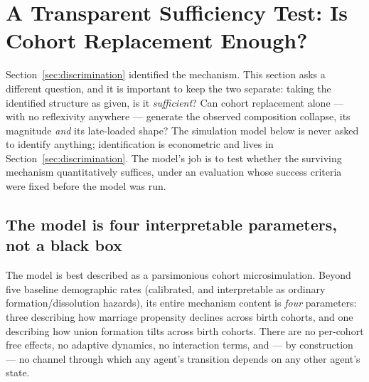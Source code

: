 \section{A Transparent Sufficiency Test: Is Cohort Replacement Enough?}
\label{sec:model}

Section~\ref{sec:discrimination} identified the mechanism. This section asks a
different question, and it is important to keep the two separate: taking the
identified structure as given, is it \emph{sufficient}? Can cohort replacement
alone --- with no reflexivity anywhere --- generate the observed composition
collapse, its magnitude \emph{and} its late-loaded shape? The simulation model
below is never asked to identify anything; identification is econometric and
lives in Section~\ref{sec:discrimination}. The model's job is to test whether
the surviving mechanism quantitatively suffices, under an evaluation whose
success criteria were fixed before the model was run.

\subsection{The model is four interpretable parameters, not a black box}
\label{sec:modelspec}

The model is best described as a parsimonious cohort microsimulation. Beyond
five baseline demographic rates (calibrated, and interpretable as ordinary
formation/dissolution hazards), its entire mechanism content is \emph{four}
parameters: three describing how marriage propensity declines across birth
cohorts, and one describing how union formation tilts across birth cohorts.
There are no per-cohort free effects, no adaptive dynamics, no interaction
terms, and --- by construction --- no channel through which any agent's
transition depends on any other agent's state.

